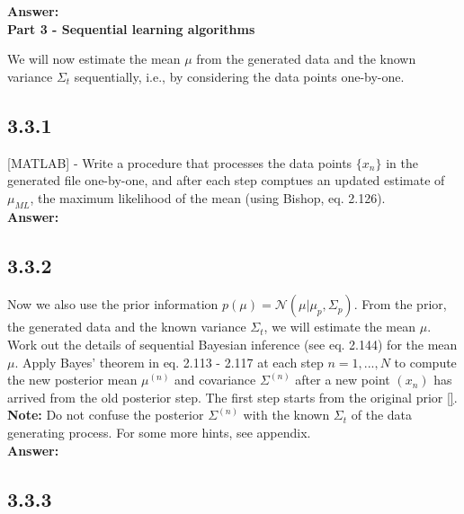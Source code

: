 \documentclass[a4paper]{article}
\begin{document}
\textbf{Answer:}\\



\textbf{Part 3 - Sequential learning algorithms}

We will now estimate the mean $\mu$ from the generated data and the known variance $\Sigma_t$ sequentially, i.e., by considering the data points one-by-one.

\subsection*{3.3.1}

[MATLAB] - Write a procedure that processes the data points $\{ x_n \}$ in the generated file one-by-one, and after each step comptues an updated estimate of $\mu_{ML}$, the maximum likelihood of the mean (using Bishop, eq. 2.126).\\


\textbf{Answer:}\\





\subsection*{3.3.2}


Now we also use the prior information $p(\mu) = \mathcal{N}(\mu | \mu_p, \Sigma_p)$. From the prior, the generated data and the known variance $\Sigma_t$, we will estimate the mean $\mu$.\\

Work out the details of sequential Bayesian inference (see eq. 2.144) for the mean $\mu$. Apply Bayes' theorem in eq. 2.113 - 2.117 at each step $n = 1, ..., N$ to compute the new posterior mean $\mu^{(n)}$ and covariance $\Sigma^{(n)}$ after a new point $(x_n)$ has arrived from the old posterior step. The first step starts from the original prior \ref{}.\\
\textbf{Note:} Do not confuse the posterior $\Sigma^{(n)}$ with the known $\Sigma_t$ of the data generating process. For some more hints, see appendix.\\

\textbf{Answer:}\\


\subsection*{3.3.3}
\end{document}

